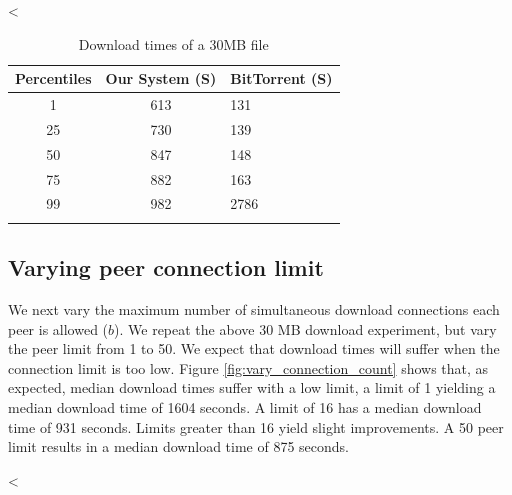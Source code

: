 <%

\begin{table}
  \caption{Download times of a 30MB file}
\begin{center}
\begin{tabular}{ c c l }
  Percentiles & Our System (S) & BitTorrent (S) \\
  \hline
  1 & 613 & 131 \\
  25 & 730 & 139 \\
  50 & 847 & 148 \\
  75 & 882 & 163 \\
  99 & 982 & 2786 \\
  \label{fig:yanc_vs_bt}
\end{tabular}
\end{center}
\end{table}

\subsection{Varying peer connection limit} 

We next vary the maximum number of simultaneous download connections each peer is allowed ($b$). We 
repeat the above 30 MB download experiment, but vary the peer limit from 1 to 50. 
We expect that download times will suffer when the connection limit is too low. Figure \ref{fig:vary_connection_count} shows that, as expected, median 
download times suffer with a low limit, a limit of 1 yielding a median download time of 1604 seconds.  A limit of 16 has a median download time of 931 seconds.  Limits greater than 16 yield
slight improvements.  A 50 peer limit results in a median download time of 875 seconds.

<%
